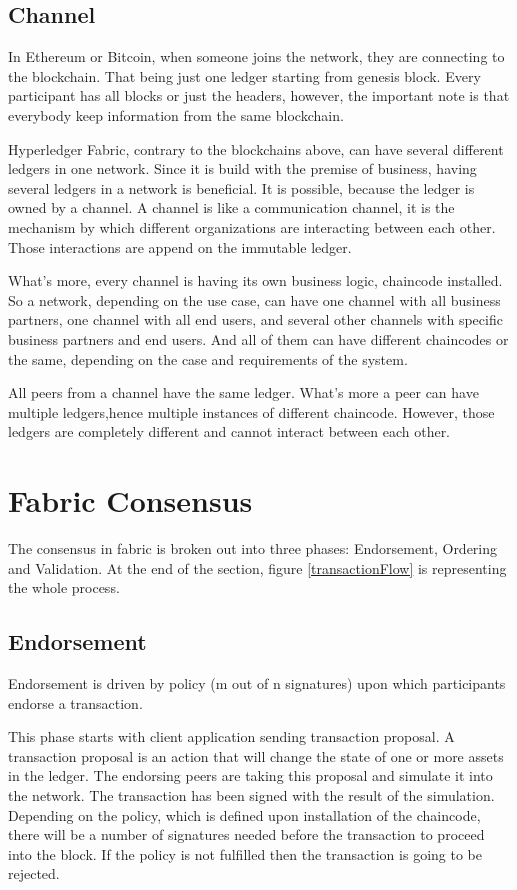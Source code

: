 \documentclass[a4paper,11pt]{report}
\begin{document}
\subsection{Channel}
In Ethereum or Bitcoin, when someone joins the network, they are connecting to the blockchain. That being just one ledger starting from genesis block. Every participant has all blocks or just the headers, however, the important note is that everybody keep information from the same blockchain.

	Hyperledger Fabric, contrary to the blockchains above, can have several different ledgers in one network. Since it is build with the premise of business, having several ledgers in a network is beneficial. It is possible, because the ledger is owned by a channel. A channel is like a communication channel, it is the mechanism by which different organizations are interacting between each other. Those interactions are append on the immutable ledger. 
	
What’s more, every channel is having its own business logic, chaincode installed. So a network, depending on the use case, can have one channel with all business partners, one channel with all end users, and several other channels with specific business partners and end users. And all of them can have different chaincodes or the same, depending on the case and requirements of the system.

All peers from a channel have the same ledger. What’s more a peer can have multiple ledgers,hence multiple instances of different chaincode. However, those ledgers are completely different and cannot interact between each other.


\section{Fabric Consensus}
\label{fabricConsensus}
The consensus in fabric is broken out into three phases: Endorsement, Ordering and Validation. At the end of the section, figure \ref{transactionFlow} is representing the whole process. 

\subsection{Endorsement}
Endorsement is driven by policy (m out of n signatures) upon which participants endorse a transaction.

	This phase starts with client application sending transaction proposal. A transaction proposal is an action that will change the state of one or more assets in the ledger. The endorsing peers are taking this proposal and simulate it into the network. The transaction has been signed with the result of the simulation. Depending on the policy, which is defined upon installation of the chaincode, there will be a number of signatures needed before the transaction to proceed into the block. If the policy is not fulfilled then the transaction is going to be rejected.
	    
\end{document}
